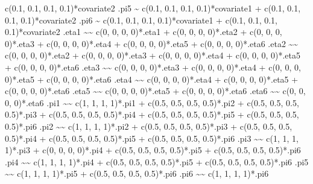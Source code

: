 \documentclass[
]{book}
\newenvironment{Shaded}{\begin{snugshade}}{\end{snugshade}}
\newcommand{\StringTok}[1]{\textcolor[rgb]{0.31,0.60,0.02}{#1}}
\begin{document}
\begin{Shaded}
\begin{Highlighting}[]
\StringTok{    c(0.1, 0.1, 0.1, 0.1)*covariate2}
\StringTok{.pi5 \textasciitilde{}}
\StringTok{    c(0.1, 0.1, 0.1, 0.1)*covariate1 +}
\StringTok{    c(0.1, 0.1, 0.1, 0.1)*covariate2}
\StringTok{.pi6 \textasciitilde{}}
\StringTok{    c(0.1, 0.1, 0.1, 0.1)*covariate1 +}
\StringTok{    c(0.1, 0.1, 0.1, 0.1)*covariate2}
\StringTok{.eta1 \textasciitilde{}\textasciitilde{}}
\StringTok{    c(0, 0, 0, 0)*.eta1 +}
\StringTok{    c(0, 0, 0, 0)*.eta2 +}
\StringTok{    c(0, 0, 0, 0)*.eta3 +}
\StringTok{    c(0, 0, 0, 0)*.eta4 +}
\StringTok{    c(0, 0, 0, 0)*.eta5 +}
\StringTok{    c(0, 0, 0, 0)*.eta6}
\StringTok{.eta2 \textasciitilde{}\textasciitilde{}}
\StringTok{    c(0, 0, 0, 0)*.eta2 +}
\StringTok{    c(0, 0, 0, 0)*.eta3 +}
\StringTok{    c(0, 0, 0, 0)*.eta4 +}
\StringTok{    c(0, 0, 0, 0)*.eta5 +}
\StringTok{    c(0, 0, 0, 0)*.eta6}
\StringTok{.eta3 \textasciitilde{}\textasciitilde{}}
\StringTok{    c(0, 0, 0, 0)*.eta3 +}
\StringTok{    c(0, 0, 0, 0)*.eta4 +}
\StringTok{    c(0, 0, 0, 0)*.eta5 +}
\StringTok{    c(0, 0, 0, 0)*.eta6}
\StringTok{.eta4 \textasciitilde{}\textasciitilde{}}
\StringTok{    c(0, 0, 0, 0)*.eta4 +}
\StringTok{    c(0, 0, 0, 0)*.eta5 +}
\StringTok{    c(0, 0, 0, 0)*.eta6}
\StringTok{.eta5 \textasciitilde{}\textasciitilde{}}
\StringTok{    c(0, 0, 0, 0)*.eta5 +}
\StringTok{    c(0, 0, 0, 0)*.eta6}
\StringTok{.eta6 \textasciitilde{}\textasciitilde{}}
\StringTok{    c(0, 0, 0, 0)*.eta6}
\StringTok{.pi1 \textasciitilde{}\textasciitilde{}}
\StringTok{    c(1, 1, 1, 1)*.pi1 +}
\StringTok{    c(0.5, 0.5, 0.5, 0.5)*.pi2 +}
\StringTok{    c(0.5, 0.5, 0.5, 0.5)*.pi3 +}
\StringTok{    c(0.5, 0.5, 0.5, 0.5)*.pi4 +}
\StringTok{    c(0.5, 0.5, 0.5, 0.5)*.pi5 +}
\StringTok{    c(0.5, 0.5, 0.5, 0.5)*.pi6}
\StringTok{.pi2 \textasciitilde{}\textasciitilde{}}
\StringTok{    c(1, 1, 1, 1)*.pi2 +}
\StringTok{    c(0.5, 0.5, 0.5, 0.5)*.pi3 +}
\StringTok{    c(0.5, 0.5, 0.5, 0.5)*.pi4 +}
\StringTok{    c(0.5, 0.5, 0.5, 0.5)*.pi5 +}
\StringTok{    c(0.5, 0.5, 0.5, 0.5)*.pi6}
\StringTok{.pi3 \textasciitilde{}\textasciitilde{}}
\StringTok{    c(1, 1, 1, 1)*.pi3 +}
\StringTok{    c(0, 0, 0, 0)*.pi4 +}
\StringTok{    c(0.5, 0.5, 0.5, 0.5)*.pi5 +}
\StringTok{    c(0.5, 0.5, 0.5, 0.5)*.pi6}
\StringTok{.pi4 \textasciitilde{}\textasciitilde{}}
\StringTok{    c(1, 1, 1, 1)*.pi4 +}
\StringTok{    c(0.5, 0.5, 0.5, 0.5)*.pi5 +}
\StringTok{    c(0.5, 0.5, 0.5, 0.5)*.pi6}
\StringTok{.pi5 \textasciitilde{}\textasciitilde{}}
\StringTok{    c(1, 1, 1, 1)*.pi5 +}
\StringTok{    c(0.5, 0.5, 0.5, 0.5)*.pi6}
\StringTok{.pi6 \textasciitilde{}\textasciitilde{}}
\StringTok{    c(1, 1, 1, 1)*.pi6}

\end{Highlighting}
\end{Shaded}
\end{document}
